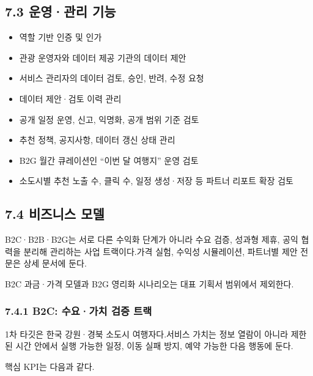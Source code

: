 \documentclass[12pt,a4paper]{article}
\newcommand{\DocNeedspace}[1]{\par\ifdim\dimexpr\pagegoal-\pagetotal\relax<#1\newpage\fi}
\begin{document}
\DocNeedspace{24\baselineskip}
\subsection*{7.3 운영·관리 기능}


\begin{itemize}
\item 역할 기반 인증 및 인가
\item 관광 운영자와 데이터 제공 기관의 데이터 제안
\item 서비스 관리자의 데이터 검토, 승인, 반려, 수정 요청
\item 데이터 제안·검토 이력 관리
\item 공개 일정 운영, 신고, 익명화, 공개 범위 기준 검토
\item 추천 정책, 공지사항, 데이터 갱신 상태 관리
\item B2G 월간 큐레이션인 “이번 달 여행지” 운영 검토
\item 소도시별 추천 노출 수, 클릭 수, 일정 생성·저장 등 파트너 리포트 확장 검토
\end{itemize}


\DocNeedspace{24\baselineskip}
\subsection*{7.4 비즈니스 모델}


\DocNeedspace{3\baselineskip}
B2C·B2B·B2G는 서로 다른 수익화 단계가 아니라 수요 검증, 성과형 제휴, 공익 협력을 분리해 관리하는 사업 트랙이다.\newline 가격 실험, 수익성 시뮬레이션, 파트너별 제안 전문은 상세 문서에 둔다.


\DocNeedspace{3\baselineskip}
B2C 과금·가격 모델과 B2G 영리화 시나리오는 대표 기획서 범위에서 제외한다.


\DocNeedspace{5\baselineskip}
\subsubsection*{7.4.1 B2C: 수요·가치 검증 트랙}


\DocNeedspace{3\baselineskip}
1차 타깃은 한국 강원·경북 소도시 여행자다.\newline 서비스 가치는 정보 열람이 아니라 제한된 시간 안에서 실행 가능한 일정, 이동 실패 방지, 예약 가능한 다음 행동에 둔다.


\DocNeedspace{3\baselineskip}
핵심 KPI는 다음과 같다.
\end{document}

